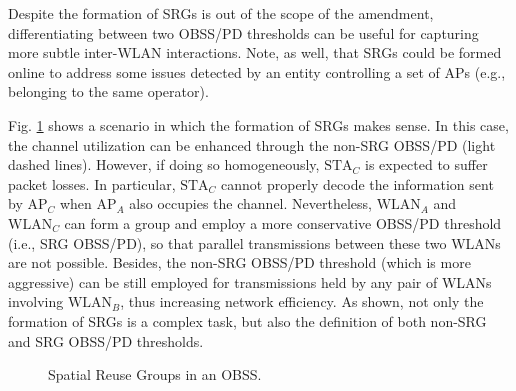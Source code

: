 \documentclass[comsoc]{IEEEtran}
\begin{document}
	Despite the formation of SRGs is out of the scope of the amendment, differentiating between two OBSS/PD thresholds can be useful for capturing more subtle inter-WLAN interactions. Note, as well, that SRGs could be formed online to address some issues detected by an entity controlling a set of APs (e.g., belonging to the same operator).
	
	Fig. \ref{fig:fig_4} shows a scenario in which the formation of SRGs makes sense. In this case, the channel utilization can be enhanced through the non-SRG OBSS/PD (light dashed lines). However, if doing so homogeneously, $\text{STA}_C$ is expected to suffer packet losses. In particular, $\text{STA}_C$ cannot properly decode the information sent by $\text{AP}_C$ when $\text{AP}_A$ also occupies the channel. Nevertheless, $\text{WLAN}_A$ and $\text{WLAN}_C$ can form a group and employ a more conservative OBSS/PD threshold (i.e., SRG OBSS/PD), so that parallel transmissions between these two WLANs are not possible. Besides, the non-SRG OBSS/PD threshold (which is more aggressive) can be still employed for transmissions held by any pair of WLANs involving $\text{WLAN}_B$, thus increasing network efficiency. As shown, not only the formation of SRGs is a complex task, but also the definition of both non-SRG and SRG OBSS/PD thresholds.
	
	\begin{figure}[ht!]
		\centering
		\caption{Spatial Reuse Groups in an OBSS.}
		\label{fig:fig_4}
	\end{figure}
	
\end{document}
